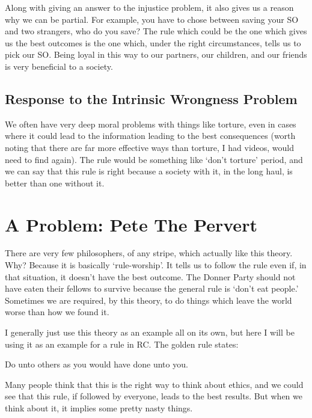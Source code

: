 Along with giving an answer to the injustice problem, it also gives us a reason why we can be partial. For example, you have to chose between saving your SO and two strangers, who do you save? The rule which could be the one which gives us the best outcomes is the one which, under the right circumstances, tells us to pick our SO. Being loyal in this way to our partners, our children, and our friends is very beneficial to a society.

\subsection{Response to the Intrinsic Wrongness Problem}

We often have very deep moral problems with things like torture, even in cases where it could lead to the information leading to the best consequences (worth noting that there are far more effective ways than torture, I had videos, would need to find again). The rule would be something like ‘don’t torture’ period, and we can say that this rule is right because a society with it, in the long haul, is better than one without it.

\section{A Problem: Pete The Pervert}

There are very few philosophers, of any stripe, which actually like this theory. Why? Because it is basically ‘rule-worship’. It tells us to follow the rule even if, in that situation, it doesn’t have the best outcome. The Donner Party should not have eaten their fellows to survive because the general rule is ‘don’t eat people.’ Sometimes we are required, by this theory, to do things which leave the world worse than how we found it.

I generally just use this theory as an example all on its own, but here I will be using it as an example for a rule in RC. The golden rule states:
\begin{center}
Do unto others as you would have done unto you.
\end{center}
Many people think that this is the right way to think about ethics, and we could see that this rule, if followed by everyone, leads to the best results. But when we think about it, it implies some pretty nasty things.

